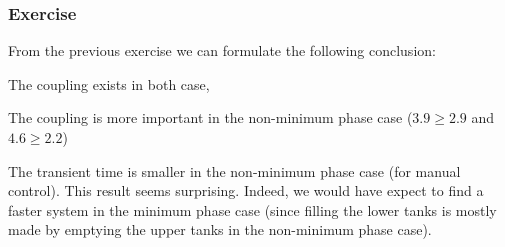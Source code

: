 \subsubsection{Exercise}

From the previous exercise we can formulate the following conclusion:
\begin{shortitemize}
\item The coupling exists in both case,
\item The coupling is more important in the non-minimum phase case ($3.9 \geq 2.9$ and $4.6 \geq 2.2$)
\item The transient time is smaller in the non-minimum phase case (for manual control). This result seems surprising. Indeed, we would have expect to find a faster system in the minimum phase case (since filling the lower tanks is mostly made by emptying the upper tanks in the non-minimum phase case).
\end{shortitemize}
